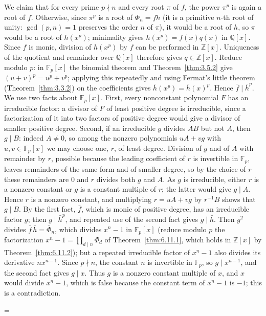 \documentclass[11pt]{article}
\makeatletter
\theoremstyle{ntstyle}
\let\nt@closedisplay\]
\def\nt@guardedclose{\@ifnextchar\par{\nt@closeafterpar}{\@ifnextchar\end{\postdisplaypenalty\@M\nt@closedisplay}{\nt@closedisplay}}}
\def\nt@closeafterpar\par{\@ifnextchar\par{\nt@closeafterpar}{\@ifnextchar\end{\postdisplaypenalty\@M\nt@closedisplay\par}{\nt@closedisplay\par}}}
\renewenvironment{proof}[1][\proofname]{\par
  \pushQED{\qed}\normalfont\topsep\medskipamount\edef\nt@afterproof{\@endparpenalty=\the\@endparpenalty\relax}\@beginparpenalty\@M\@endparpenalty\@M\let\]\nt@guardedclose\trivlist\item[]\textit{#1\@addpunct{.}} \ignorespaces}{\ifvmode\addpenalty\@M\fi\popQED\nt@afterproof\endtrivlist\@endpefalse}
\makeatother
\begin{document}
\begin{proof}
	We claim that for every prime $p\nmid n$ and every root $\pi$ of $f$,
	the power $\pi^{p}$ is again a root of $f$. Otherwise, since $\pi^{p}$ is a
	root of $\Phi_n = fh$ (it is a primitive $n$-th root of unity:
	$\gcd(p, n) = 1$ preserves the order $n$ of $\pi$), it would be a
	root of $h$, so $\pi$ would be a root of $h(x^{p})$; minimality
	gives $h(x^{p})=f(x)q(x)$ in $\mathbb{Q}[x]$. Since $f$ is monic,
	division of $h(x^p)$ by $f$ can be performed in $\mathbb{Z}[x]$.
	Uniqueness of the quotient and remainder over $\mathbb{Q}[x]$ therefore
	gives $q\in\mathbb{Z}[x]$. Reduce modulo $p$:
	in $\mathbb{F}_p[x]$ the binomial theorem and
	Theorem~\ref{thm:3.5.2} give $(u+v)^p=u^p+v^p$; applying this repeatedly
	and using Fermat's little theorem (Theorem~\ref{thm:3.3.2}) on the
	coefficients gives $\bar h(x^{p}) = \bar h(x)^{p}$. Hence
	$\bar f\mid\bar h^{p}$. We use two facts about $\mathbb{F}_p[x]$.
	First, every nonconstant polynomial $F$ has an irreducible factor: a
	divisor of $F$ of least positive degree is irreducible, since a
	factorization of it into two factors of positive degree would give a
	divisor of smaller positive degree. Second, if an irreducible $g$
	divides $AB$ but not $A$, then $g\mid B$: indeed $A\neq0$, so among the
	nonzero polynomials $uA+vg$ with $u,v\in\mathbb{F}_p[x]$ we may choose
	one, $r$, of least degree. Division of $g$ and of $A$ with remainder by $r$, possible
	because the leading coefficient of $r$ is invertible in $\mathbb{F}_p$,
	leaves remainders of the same form and of smaller degree, so by the
	choice of $r$ these remainders are $0$ and $r$ divides both $g$ and $A$. As $g$ is
	irreducible, either $r$ is a nonzero constant or $g$ is a constant
	multiple of $r$; the latter would give $g\mid A$. Hence $r$ is a nonzero
	constant, and multiplying $r=uA+vg$ by $r^{-1}B$ shows that
	$g\mid B$. By the first fact, $\bar f$, which is monic of positive
	degree, has an irreducible factor $g$; then $g\mid\bar h^{p}$, and
	repeated use of the second fact gives $g\mid\bar h$. Then $g^2$
	divides $\bar f\,\bar h = \bar\Phi_n$, which divides $x^{n} - 1$ in
	$\mathbb{F}_p[x]$ (reduce modulo $p$ the factorization $x^n-1=\prod_{d\mid n}\Phi_d$ of Theorem~\ref{thm:6.11.1}, which holds in $\mathbb{Z}[x]$ by Theorem~\ref{thm:6.11.2}); but a repeated irreducible factor of $x^{n} - 1$
	also divides its derivative $nx^{n-1}$. Since $p\nmid n$, the constant
	$n$ is invertible in $\mathbb{F}_p$, so $g\mid x^{n-1}$, and the second
	fact gives $g\mid x$. Thus $g$ is a nonzero constant multiple of $x$,
	and $x$ would divide $x^n-1$, which is false because the constant
	term of $x^n-1$ is $-1$; this is a contradiction.


\end{proof}
\end{document}
